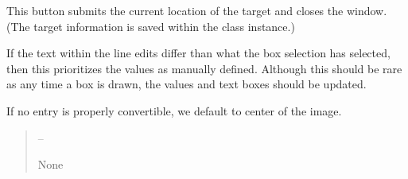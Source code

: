 \documentclass[letterpaper,11pt,english]{sphinxmanual}
\begin{document}
\begin{savenotes}
\begin{fulllineitems}
\begin{savenotes}
\begin{fulllineitems}
\end{fulllineitems}\end{savenotes}


\begin{savenotes}\begin{fulllineitems}
\label{\detokenize{code/opihiexarata.gui.selector:opihiexarata.gui.selector.TargetSelectorWindow.__connect_push_button_submit_target}}
\pysigstartsignatures
{}
\pysigstopsignatures
\sphinxAtStartPar
This button submits the current location of the target and closes
the window. (The target information is saved within the class
instance.)

\sphinxAtStartPar
If the text within the line edits differ than what the box selection
has selected, then this prioritizes the values as manually defined.
Although this should be rare as any time a box is drawn, the values
and text boxes should be updated.

\sphinxAtStartPar
If no entry is properly convertible, we default to center of the image.
\begin{quote}\begin{description}
\sphinxAtStartPar
{} – 

\sphinxAtStartPar
None

\end{description}\end{quote}

\end{fulllineitems}\end{savenotes}



\end{fulllineitems}
\end{savenotes}
\end{document}
